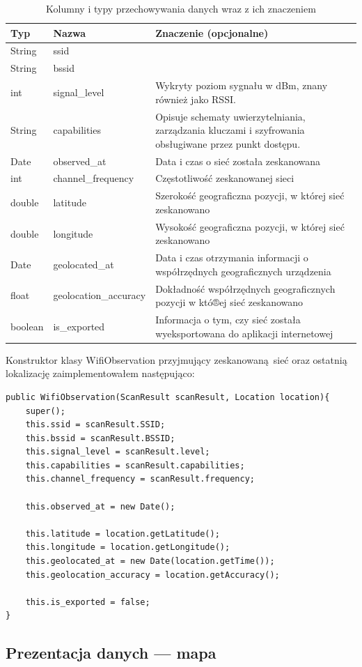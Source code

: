 \begin{table}
\caption{Kolumny i typy przechowywania danych wraz z ich znaczeniem}
\label{table:dbscheme}
\begin{tabular} { |l|l|p{7cm}|  }
\hline
Typ & Nazwa & Znaczenie (opcjonalne) \\
\hline
\hline
String & ssid & \\
\hline
String & bssid & \\
\hline
int & signal_level & Wykryty poziom sygnału w dBm, znany również jako RSSI.\cite{scanResultAndroidDocs} \\
\hline
String & capabilities & Opisuje schematy uwierzytelniania, zarządzania kluczami i szyfrowania obsługiwane przez punkt dostępu.\cite{scanResultAndroidDocs} \\
\hline
Date & observed_at & Data i czas o sieć została zeskanowana \\
\hline
int & channel_frequency & Częstotliwość zeskanowanej sieci \\
\hline
double & latitude & Szerokość geograficzna pozycji, w której sieć zeskanowano \\
\hline
double & longitude & Wysokość geograficzna pozycji, w której sieć zeskanowano \\
\hline
Date & geolocated_at & Data i czas otrzymania informacji o współrzędnych geograficznych urządzenia \\
\hline
float & geolocation_accuracy & Dokładność współrzędnych geograficznych pozycji w któ®ej sieć zeskanowano \\
\hline
boolean & is_exported & Informacja o tym, czy sieć została wyeksportowana do aplikacji internetowej \\
\hline
\end{tabular}
\end{table}

Konstruktor klasy WifiObservation przyjmujący zeskanowaną sieć oraz ostatnią lokalizację zaimplementowałem następująco:
\begin{verbatim}
public WifiObservation(ScanResult scanResult, Location location){
    super();
    this.ssid = scanResult.SSID;
    this.bssid = scanResult.BSSID;
    this.signal_level = scanResult.level;
    this.capabilities = scanResult.capabilities;
    this.channel_frequency = scanResult.frequency;

    this.observed_at = new Date();

    this.latitude = location.getLatitude();
    this.longitude = location.getLongitude();
    this.geolocated_at = new Date(location.getTime());
    this.geolocation_accuracy = location.getAccuracy();

    this.is_exported = false;
}
\end{verbatim}

\subsection{Prezentacja danych — mapa}

